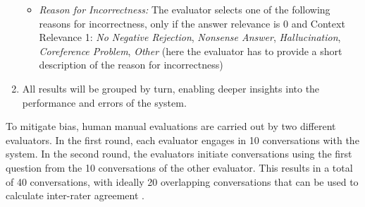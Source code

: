 \begin{enumerate}
\begin{itemize}
            \item \textit{Reason for Incorrectness:} The evaluator selects one of the following reasons for incorrectness, only if the answer relevance is 0 and Context Relevance 1: \textit{No Negative Rejection}, \textit{Nonsense Answer}, \textit{Hallucination}, \textit{Coreference Problem}, \textit{Other} (here the evaluator has to provide a short description of the reason for incorrectness) 
        \end{itemize}
    \item All results will be grouped by turn, enabling deeper insights into the performance and errors of the system.
\end{enumerate}

To mitigate bias, human manual evaluations are carried out by two different evaluators. In the first round, each evaluator engages in 10 conversations with the system. In the second round, the evaluators initiate conversations using the first question from the 10 conversations of the other evaluator. This results in a total of 40 conversations, with ideally 20 overlapping conversations that can be used to calculate inter-rater agreement \cite{cohen_coefficient_1960}.
    


